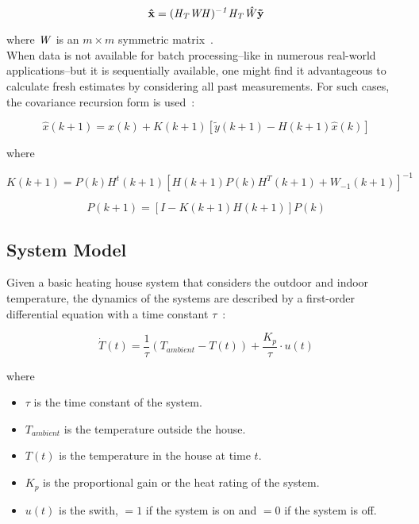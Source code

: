 \begin{equation}
    \bf{\hat{x}} = (\it{H}_{T} \it{W} \it{H})^{-1} \it{H}_{T} \hat{W} \bf{\tilde{y}}
\end{equation}

where $\it{W}$ is an $m \times m$ symmetric matrix~\cite{crassidis2004dynamic}. \\

When data is not available for batch processing--like in numerous real-world applications--but it is sequentially available, one might find it advantageous to calculate fresh estimates by considering all past measurements. For such cases, the covariance recursion form is used~\cite{crassidis2004dynamic}:

\begin{equation}
    \hat{x}(k + 1) = \hat{x}(k) + K(k + 1) \left[ \tilde{y}(k + 1) - H(k + 1) \hat{x}(k) \right]
\end{equation}

where

$$
K(k + 1) = P(k) H^{t}(k + 1) \left[ H(k + 1) P(k) H^{T}(k + 1) + W_{-1}(k + 1) \right]^{-1}
$$

$$
P(k + 1) = \left[ I - K(k + 1) H(k + 1) \right] P(k)
$$


\subsection{System Model}
Given a basic heating house system that considers the outdoor and indoor temperature, the dynamics of the systems are described by a first-order differential equation with a time constant $\tau$~\cite{franklin1994dynsys}:

\begin{equation}
    \dot{T}(t) = \frac{1}{\tau} \left( T_{ambient} - T(t) \right) + \frac{K_{p}}{\tau} \cdot u(t)
\end{equation}

where

\begin{itemize}
    \item $\tau$ is the time constant of the system.

    \item $T_{ambient}$ is the temperature outside the house.

    \item $T(t)$ is the temperature in the house at time $t$.

    \item $K_{p}$ is the proportional gain or the heat rating of the system.

    \item $u(t)$ is the swith, $= 1$ if the system is on and $= 0$ if the system is off. \\
\end{itemize}

